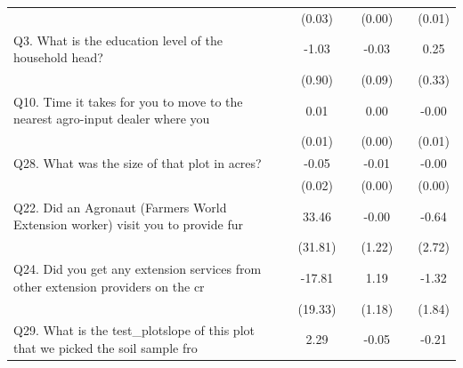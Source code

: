 {\begin{tabular}{l*{6}{c}}
                    &                     &      (0.03)         &                     &      (0.00)         &                     &      (0.01)         \\
[1em]
Q3. What is the education level of the household head?&                     &       -1.03         &                     &       -0.03         &                     &        0.25         \\
                    &                     &      (0.90)         &                     &      (0.09)         &                     &      (0.33)         \\
[1em]
Q10. Time it takes for you to move  to  the nearest agro-input dealer where you &                     &        0.01         &                     &        0.00         &                     &       -0.00         \\
                    &                     &      (0.01)         &                     &      (0.00)         &                     &      (0.01)         \\
[1em]
Q28. What was the size of that  plot in acres?&                     &       -0.05\sym{***}&                     &       -0.01\sym{***}&                     &       -0.00         \\
                    &                     &      (0.02)         &                     &      (0.00)         &                     &      (0.00)         \\
[1em]
Q22. Did an Agronaut  (Farmers World Extension worker)  visit you to provide fur&                     &       33.46         &                     &       -0.00         &                     &       -0.64         \\
                    &                     &     (31.81)         &                     &      (1.22)         &                     &      (2.72)         \\
[1em]
Q24. Did you get any extension services from other extension providers on the cr&                     &      -17.81         &                     &        1.19         &                     &       -1.32         \\
                    &                     &     (19.33)         &                     &      (1.18)         &                     &      (1.84)         \\
[1em]
Q29. What is the test\_plotslope of this  plot that we picked the soil sample fro&                     &        2.29         &                     &       -0.05         &                     &       -0.21         \\

\end{tabular}}
